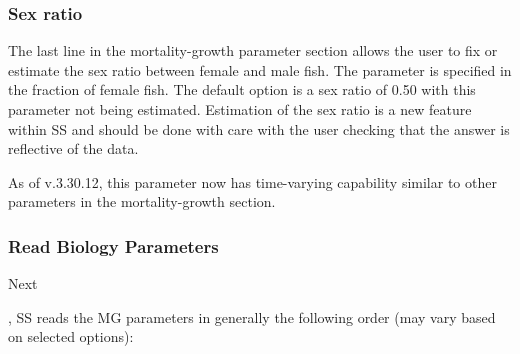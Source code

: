 \subsubsection{Sex ratio}
The last line in the mortality-growth parameter section allows the user to fix or estimate the sex ratio between female and male fish.  The parameter is specified in the fraction of female fish. The default option is a sex ratio of 0.50 with this parameter not being estimated.  Estimation of the sex ratio is a new feature within SS and should be done with care with the user checking that the answer is reflective of the data.  

As of v.3.30.12, this parameter now has time-varying capability similar to other parameters in the mortality-growth section.

\subsubsection{Read Biology Parameters}
\hypertarget{MGorder}{Next}, SS reads the MG parameters in generally the following order (may vary based on selected options):

